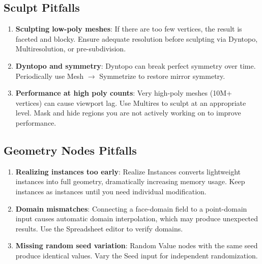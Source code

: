 \subsection{Sculpt Pitfalls}

\begin{enumerate}[leftmargin=2em]
  \item \textbf{Sculpting low-poly meshes}: If there are too few vertices, the result is faceted and blocky. Ensure adequate resolution before sculpting via Dyntopo, Multiresolution, or pre-subdivision.

  \item \textbf{Dyntopo and symmetry}: Dyntopo can break perfect symmetry over time. Periodically use Mesh $\rightarrow$ Symmetrize to restore mirror symmetry.

  \item \textbf{Performance at high poly counts}: Very high-poly meshes (10M+ vertices) can cause viewport lag. Use Multires to sculpt at an appropriate level. Mask and hide regions you are not actively working on to improve performance.
\end{enumerate}

\subsection{Geometry Nodes Pitfalls}

\begin{enumerate}[leftmargin=2em]
  \item \textbf{Realizing instances too early}: Realize Instances converts lightweight instances into full geometry, dramatically increasing memory usage. Keep instances as instances until you need individual modification.

  \item \textbf{Domain mismatches}: Connecting a face-domain field to a point-domain input causes automatic domain interpolation, which may produce unexpected results. Use the Spreadsheet editor to verify domains.

  \item \textbf{Missing random seed variation}: Random Value nodes with the same seed produce identical values. Vary the Seed input for independent randomization.
\end{enumerate}

